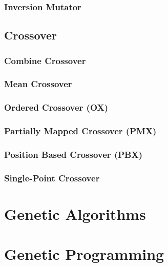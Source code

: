       \subsubsection{Inversion Mutator}
      \label{sec:keen:operators:mutation:inversion}
        \Blindtext
    \subsection{Crossover}
    \label{sec:keen:operators:crossover}
      \subsubsection{Combine Crossover}
      \label{sec:keen:operators:crossover:combine}
        \Blindtext
      \subsubsection{Mean Crossover}
      \label{sec:keen:operators:crossover:mean}
        \Blindtext
      \subsubsection{Ordered Crossover (OX)}
      \label{sec:keen:operators:crossover:ordered}
        \Blindtext
      \subsubsection{Partially Mapped Crossover (PMX)}
      \label{sec:keen:operators:crossover:partially_mapped}
        \Blindtext
      \subsubsection{Position Based Crossover (PBX)}
      \label{sec:keen:operators:crossover:position_based}
        \Blindtext
      \subsubsection{Single-Point Crossover}
      \label{sec:keen:operators:crossover:single_point}
        \Blindtext
  \section{Genetic Algorithms}
  \label{sec:genetic_algorithms}
    \Blindtext
  \section{Genetic Programming}
  \label{sec:genetic_programming}
